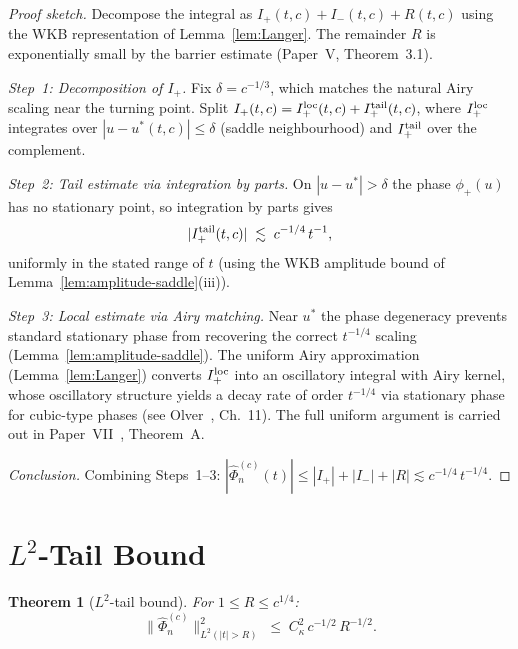\documentclass[12pt,a4paper]{amsart}
\newtheorem{theorem}{Theorem}[section]
\theoremstyle{definition}
\theoremstyle{remark}
\begin{document}
\begin{proof}[Proof sketch]
Decompose the integral as $I_+(t,c) + I_-(t,c) + R(t,c)$ using the
WKB representation of Lemma~\ref{lem:Langer}.
The remainder $R$ is exponentially small by the barrier estimate
(Paper~V, Theorem~3.1).

\medskip
\noindent\textit{Step~1: Decomposition of $I_+$.}
Fix $\delta = c^{-1/3}$, which matches the natural Airy scaling
near the turning point.
Split
$I_+(t,c) = I_+^{\rm loc}(t,c) + I_+^{\rm tail}(t,c)$,
where $I_+^{\rm loc}$ integrates over $|u - u^*(t,c)| \le \delta$
(saddle neighbourhood) and $I_+^{\rm tail}$ over the complement.

\medskip
\noindent\textit{Step~2: Tail estimate via integration by parts.}
On $|u - u^*| > \delta$ the phase $\phi_+(u)$ has no stationary
point, so integration by parts gives
\[
|I_+^{\rm tail}(t,c)| \;\lesssim\; c^{-1/4}\,t^{-1},
\]
uniformly in the stated range of $t$
(using the WKB amplitude bound of Lemma~\ref{lem:amplitude-saddle}(iii)).

\medskip
\noindent\textit{Step~3: Local estimate via Airy matching.}
Near $u^*$ the phase degeneracy prevents standard stationary phase
from recovering the correct $t^{-1/4}$ scaling
(Lemma~\ref{lem:amplitude-saddle}).
The uniform Airy approximation (Lemma~\ref{lem:Langer}) converts
$I_+^{\rm loc}$ into an oscillatory integral with Airy kernel,
whose oscillatory structure yields a decay rate of order $t^{-1/4}$
via stationary phase for cubic-type phases
(see Olver~\cite{Olver1974}, Ch.~11).
The full uniform argument is carried out in
Paper~{\rm VII}~\cite{PaperVII}, Theorem~A.

\medskip
\noindent\textit{Conclusion.}
Combining Steps~1--3:
$|\widehat\Phi_n^{(c)}(t)| \le |I_+| + |I_-| + |R|
\lesssim c^{-1/4}\,t^{-1/4}$.
\end{proof}

\section{$L^2$-Tail Bound}
\label{sec:L2tail}

\begin{theorem}[$L^2$-tail bound]
\label{thm:L2-tail}
For $1 \le R \le c^{1/4}$:
\begin{equation}
\|\widehat\Phi_n^{(c)}\|_{L^2(|t|>R)}^2
\;\le\; C_\kappa^2\,c^{-1/2}\,R^{-1/2}.
\end{equation}
\end{theorem}
\end{document}
